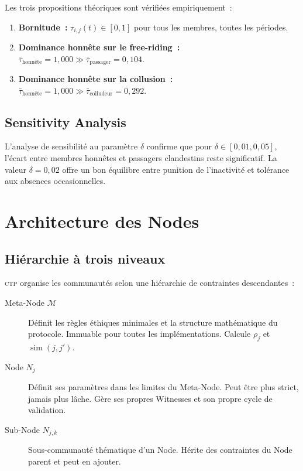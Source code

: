 \documentclass[12pt,a4paper]{article}
\theoremstyle{definition}
\theoremstyle{plain}
\theoremstyle{remark}
\newcommand{\CTP}{\textsc{ctp}}
\newcommand{\trustscore}{\tau}
\newcommand{\1}{\mathbf{1}}
\begin{document}
Les trois propositions théoriques sont vérifiées empiriquement~:

\begin{enumerate}
  \item \textbf{Bornitude~:} $\trustscore_{i,j}(t) \in [0,1]$ pour tous les
    membres, toutes les périodes. \hfill \checkmark

  \item \textbf{Dominance honnête sur le free-riding~:}
    $\bar{\trustscore}_{\text{honnête}} = 1{,}000 \gg
    \bar{\trustscore}_{\text{passager}} = 0{,}104$. \hfill \checkmark

  \item \textbf{Dominance honnête sur la collusion~:}
    $\bar{\trustscore}_{\text{honnête}} = 1{,}000 \gg
    \bar{\trustscore}_{\text{colludeur}} = 0{,}292$. \hfill \checkmark
\end{enumerate}

\subsection{Sensitivity Analysis}

L'analyse de sensibilité au paramètre $\delta$ confirme que pour
$\delta \in [0{,}01, 0{,}05]$, l'écart entre membres honnêtes et passagers
clandestins reste significatif. La valeur $\delta = 0{,}02$ offre un bon
équilibre entre punition de l'inactivité et tolérance aux absences
occasionnelles.

\section{Architecture des Nodes}
\label{sec:architecture}

\subsection{Hiérarchie à trois niveaux}

\CTP{} organise les communautés selon une hiérarchie de contraintes
descendantes~:

\begin{description}
  \item[Meta-Node $\mathcal{M}$] Définit les règles éthiques minimales et la
    structure mathématique du protocole. Immuable pour toutes les
    implémentations. Calcule $\rho_j$ et $\operatorname{sim}(j, j')$.

  \item[Node $N_j$] Définit ses paramètres dans les limites du Meta-Node.
    Peut être plus strict, jamais plus lâche. Gère ses propres Witnesses et
    son propre cycle de validation.

  \item[Sub-Node $N_{j,k}$] Sous-communauté thématique d'un Node. Hérite des
    contraintes du Node parent et peut en ajouter.
\end{description}
\end{document}
